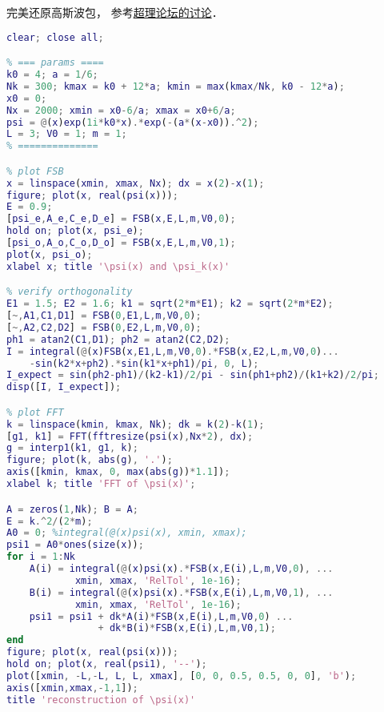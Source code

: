 
\begin{issues}
\issueDraft
\end{issues}

完美还原高斯波包， 参考\href{https://chaoli.club/index.php/4541/}{超理论坛的讨论}．
\begin{lstlisting}[language=matlab, caption=FSBsct.m]
clear; close all;

% === params ====
k0 = 4; a = 1/6;
Nk = 300; kmax = k0 + 12*a; kmin = max(kmax/Nk, k0 - 12*a);
x0 = 0;
Nx = 2000; xmin = x0-6/a; xmax = x0+6/a;
psi = @(x)exp(1i*k0*x).*exp(-(a*(x-x0)).^2);
L = 3; V0 = 1; m = 1;
% ==============

% plot FSB
x = linspace(xmin, xmax, Nx); dx = x(2)-x(1);
figure; plot(x, real(psi(x)));
E = 0.9;
[psi_e,A_e,C_e,D_e] = FSB(x,E,L,m,V0,0);
hold on; plot(x, psi_e);
[psi_o,A_o,C_o,D_o] = FSB(x,E,L,m,V0,1);
plot(x, psi_o);
xlabel x; title '\psi(x) and \psi_k(x)'

% verify orthogonality
E1 = 1.5; E2 = 1.6; k1 = sqrt(2*m*E1); k2 = sqrt(2*m*E2);
[~,A1,C1,D1] = FSB(0,E1,L,m,V0,0);
[~,A2,C2,D2] = FSB(0,E2,L,m,V0,0);
ph1 = atan2(C1,D1); ph2 = atan2(C2,D2);
I = integral(@(x)FSB(x,E1,L,m,V0,0).*FSB(x,E2,L,m,V0,0)...
    -sin(k2*x+ph2).*sin(k1*x+ph1)/pi, 0, L);
I_expect = sin(ph2-ph1)/(k2-k1)/2/pi - sin(ph1+ph2)/(k1+k2)/2/pi;
disp([I, I_expect]);

% plot FFT
k = linspace(kmin, kmax, Nk); dk = k(2)-k(1);
[g1, k1] = FFT(fftresize(psi(x),Nx*2), dx);
g = interp1(k1, g1, k);
figure; plot(k, abs(g), '.');
axis([kmin, kmax, 0, max(abs(g))*1.1]);
xlabel k; title 'FFT of \psi(x)';

A = zeros(1,Nk); B = A;
E = k.^2/(2*m);
A0 = 0; %integral(@(x)psi(x), xmin, xmax);
psi1 = A0*ones(size(x));
for i = 1:Nk
    A(i) = integral(@(x)psi(x).*FSB(x,E(i),L,m,V0,0), ...
            xmin, xmax, 'RelTol', 1e-16);
    B(i) = integral(@(x)psi(x).*FSB(x,E(i),L,m,V0,1), ...
            xmin, xmax, 'RelTol', 1e-16);
    psi1 = psi1 + dk*A(i)*FSB(x,E(i),L,m,V0,0) ...
                + dk*B(i)*FSB(x,E(i),L,m,V0,1);
end
figure; plot(x, real(psi(x)));
hold on; plot(x, real(psi1), '--');
plot([xmin, -L,-L, L, L, xmax], [0, 0, 0.5, 0.5, 0, 0], 'b');
axis([xmin,xmax,-1,1]);
title 'reconstruction of \psi(x)'
\end{lstlisting}
